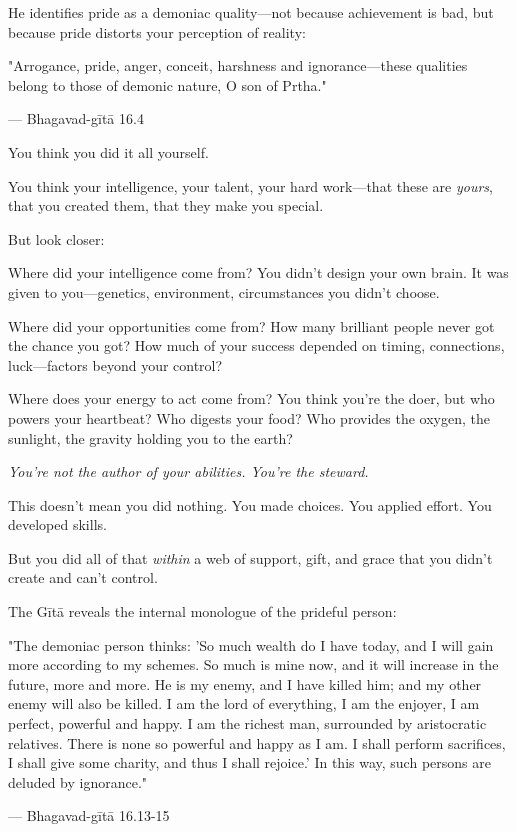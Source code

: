 \documentclass[11pt,twoside]{book}
\begin{document}
He identifies pride as a demoniac quality—not because achievement is bad, but because pride distorts your perception of reality:

\begin{pullquote}
"Arrogance, pride, anger, conceit, harshness and ignorance—these qualities belong to those of demonic nature, O son of Prtha."

--- Bhagavad-gītā 16.4
\end{pullquote}

You think you did it all yourself.

You think your intelligence, your talent, your hard work—that these are \emph{yours}, that you created them, that they make you special.

But look closer:

Where did your intelligence come from? You didn't design your own brain. It was given to you—genetics, environment, circumstances you didn't choose.

Where did your opportunities come from? How many brilliant people never got the chance you got? How much of your success depended on timing, connections, luck—factors beyond your control?

Where does your energy to act come from? You think you're the doer, but who powers your heartbeat? Who digests your food? Who provides the oxygen, the sunlight, the gravity holding you to the earth?

\emph{You're not the author of your abilities. You're the steward.}

This doesn't mean you did nothing. You made choices. You applied effort. You developed skills.

But you did all of that \emph{within} a web of support, gift, and grace that you didn't create and can't control.

The Gītā reveals the internal monologue of the prideful person:

\begin{pullquote}
"The demoniac person thinks: 'So much wealth do I have today, and I will gain more according to my schemes. So much is mine now, and it will increase in the future, more and more. He is my enemy, and I have killed him; and my other enemy will also be killed. I am the lord of everything, I am the enjoyer, I am perfect, powerful and happy. I am the richest man, surrounded by aristocratic relatives. There is none so powerful and happy as I am. I shall perform sacrifices, I shall give some charity, and thus I shall rejoice.' In this way, such persons are deluded by ignorance."

--- Bhagavad-gītā 16.13-15
\end{pullquote}
\end{document}
